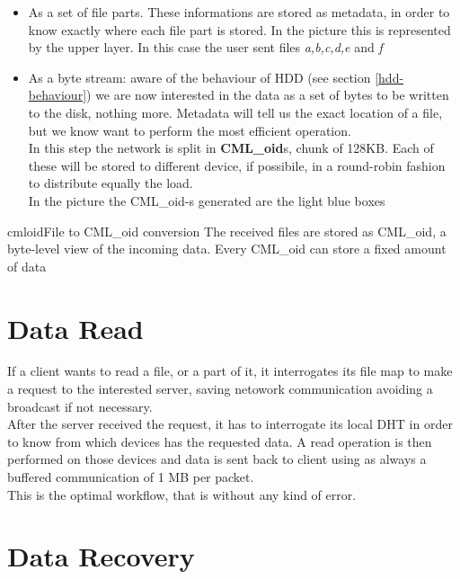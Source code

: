 \begin{itemize}
    \item As a set of file parts. These informations are stored as metadata, in
        order to know exactly where each file part is stored. In the picture
        this is represented by the upper layer. In this case the user sent files
        \textit{a,b,c,d,e} and \textit{f}
    \item As a byte stream: aware of the behaviour of HDD (see section
        \ref{hdd-behaviour}) we are now interested in the data as a set of bytes
        to be written to the disk, nothing more. Metadata will tell us the exact
        location of a file, but we know want to perform the most efficient
        operation. \\
        In this step the network is split in \textbf{CML\_oid}s, chunk of 128KB.
        Each of these will be stored to different device, if possibile, in a
        round-robin fashion to distribute equally the load. \\
        In the picture the CML\_oid-s generated are the light blue boxes
\end{itemize}

\begin{myimage}{cmloid}{File to CML\_oid conversion}
    The received files are stored as CML\_oid, a byte-level view of the incoming
    data. Every CML\_oid can store a fixed amount of data
\end{myimage}

\section{Data Read}
If a client wants to read a file, or a part of it, it interrogates its file map
to make a request to the interested server, saving netowork communication
avoiding a broadcast if not necessary. \\
After the server received the request, it has to interrogate its local DHT in
order to know from which devices has the requested data. A read operation is
then performed on those devices and data is sent back to client using as always
a buffered communication of 1 MB per packet. \\
This is the optimal workflow, that is without any kind of error.

\section{Data Recovery}

